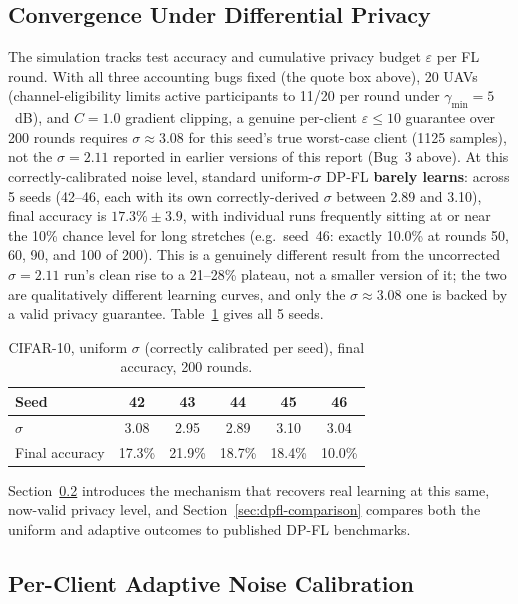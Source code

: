 \documentclass[12pt,a4paper]{article}
\begin{document}
\subsection{Convergence Under Differential Privacy}
\label{sec:dp-convergence}

The simulation tracks test accuracy and cumulative privacy budget $\varepsilon$
per FL round. With all three accounting bugs fixed (the quote box above), 20 UAVs
(channel-eligibility limits active participants to 11/20 per round under
$\gamma_{\min}=5$~dB), and $C = 1.0$ gradient clipping, a genuine per-client
$\varepsilon\le10$ guarantee over 200 rounds requires $\sigma \approx 3.08$
for this seed's true worst-case client (1125 samples), not the $\sigma=2.11$
reported in earlier versions of this report (Bug~3 above). At this
correctly-calibrated noise level, standard uniform-$\sigma$ DP-FL
\textbf{barely learns}: across 5 seeds (42--46, each with its own
correctly-derived $\sigma$ between 2.89 and 3.10), final accuracy is
$17.3\%\pm3.9$, with individual runs frequently sitting at or near the
10\% chance level for long stretches (e.g.\ seed~46: exactly 10.0\% at
rounds 50, 60, 90, and 100 of 200). This is a genuinely different result
from the uncorrected $\sigma=2.11$ run's clean rise to a 21--28\% plateau,
not a smaller version of it; the two are qualitatively different learning
curves, and only the $\sigma\approx3.08$ one is backed by a valid privacy
guarantee. Table~\ref{tab:cifar-uniform-5seed} gives all 5 seeds.

\begin{table}[H]
  \centering
  \caption{CIFAR-10, uniform $\sigma$ (correctly calibrated per seed), final accuracy, 200 rounds.}
  \label{tab:cifar-uniform-5seed}
  \begin{tabular}{lccccc}
    \toprule
    Seed & 42 & 43 & 44 & 45 & 46 \\
    \midrule
    $\sigma$ & 3.08 & 2.95 & 2.89 & 3.10 & 3.04 \\
    Final accuracy & 17.3\% & 21.9\% & 18.7\% & 18.4\% & 10.0\% \\
    \bottomrule
  \end{tabular}
\end{table}

Section~\ref{sec:adaptive-sigma} introduces the mechanism that recovers
real learning at this same, now-valid privacy level, and
Section~\ref{sec:dpfl-comparison} compares both the uniform and adaptive
outcomes to published DP-FL benchmarks.

\subsection{Per-Client Adaptive Noise Calibration}
\label{sec:adaptive-sigma}
\end{document}
